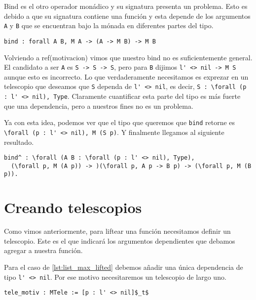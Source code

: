 Bind es el otro operador monádico y su signatura presenta un problema. Esto es debido a que su signatura contiene una función y esta depende de los argumentos \lstinline{A} y \lstinline{B} que se encuentran bajo la mónada en diferentes partes del tipo.

\begin{lstlisting}[float=h,frame=tb,caption={Signatura de bind},label=lst:bind]
bind : forall A B, M A -> (A -> M B) -> M B
\end{lstlisting}

Volviendo a ref(motivacion) vimos que nuestro bind no es suficientemente general. El candidato a ser \lstinline{A} es \lstinline{S -> S -> S}, pero para \lstinline{B} dijimos \lstinline{l' <> nil -> M S} aunque esto es incorrecto. Lo que verdaderamente necesitamos es exprezar en un telescopio que deseamos que \texttt{S} dependa de \lstinline{l' <> nil}, es decir, \lstinline{S : \forall (p : l' <> nil), Type}. Claramente cuantificar esta parte del tipo es más fuerte que una dependencia, pero a nuestros fines no es un problema.

Ya con esta idea, podemos ver que el tipo que queremos que \lstinline{bind} retorne es \lstinline{\forall (p : l' <> nil), M (S p)}. Y finalmente llegamos al siguiente resultado.

\begin{lstlisting}[float=h,frame=tb,caption={Nueva signatura de bind},label=lst:bind_motiv]
bind^ : \forall (A B : \forall (p : l' <> nil), Type),
  (\forall p, M (A p)) -> )(\forall p, A p -> B p) -> (\forall p, M (B p)).
\end{lstlisting}

\section{Creando telescopios}

Como vimos anteriormente, para liftear una función necesitamos definir un telescopio. Este es el que indicará los argumentos dependientes que debamos agregar a nuestra función.

Para el caso de \ref{lst:list_max_lifted} debemos añadir una única dependencia de tipo \lstinline{l' <> nil}. Por ese motivo necesitaremos un telescopio de largo uno.

\begin{lstlisting}[float=h,frame=tb,caption={Nueva signatura de bind},label=lst:list_max_tele]
tele_motiv : MTele := [p : l' <> nil]$_t$
\end{lstlisting}

